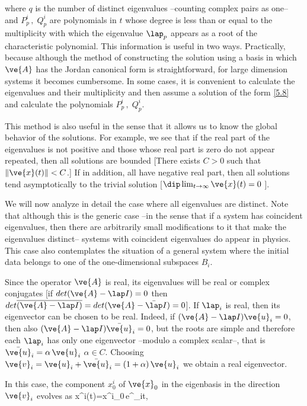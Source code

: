 \noi
where $q$ is the number of distinct eigenvalues --counting complex pairs as one-- and $P^i_p\,,\;Q^i_p$ are polynomials in
$t$ whose degree is less than or equal to the multiplicity with which the
eigenvalue $\lap_p$ appears as a root of the characteristic polynomial. This
information is useful in two ways. Practically, because
although the method of constructing the solution using a basis in
which $\ve{A}$ has the Jordan canonical form is straightforward, for
large dimension systems it becomes cumbersome. In some cases, it is
convenient to calculate the eigenvalues and their multiplicity and then
assume a solution of the form \ref{5.8} and calculate the polynomials 
$P^i_p\,,\;Q^i_p$.

This method is also useful in the sense that it allows us to know the
global behavior of the solutions. For example, we see that if the
real part of the eigenvalues is not positive and those whose real
part is zero do not appear repeated, then all solutions are
bounded [There exists $C>0$ such that $\|\ve{x}(t)\|<C$.] If in addition, all have
negative real part, then all solutions tend
asymptotically to the trivial solution [$\dip\lim_{t\to\infty}
\ve{x}(t) = 0$ ].


We will now analyze in detail the case where all eigenvalues are distinct. Note that although this is the generic case --in the sense that if a system has coincident eigenvalues, then there are arbitrarily small modifications to it that make the eigenvalues distinct-- systems with coincident eigenvalues do appear in physics. This case also contemplates the situation of a general system where the initial data belongs to one of the one-dimensional subspaces $B_i$.

Since the operator $\ve{A}$ is real, its eigenvalues will be real or complex conjugates [if $det(\ve{A}-\lap I)=0$ then $det\overline{(\ve{A}-\lap I)}=det(\ve{A}-\bar{\lap} I)=0$]. If $\lap_i$ is real, then its eigenvector can be chosen to be real. 
Indeed, if $(\ve{A}-\lap I)\ve{u}_i=0$, then also 
$(\ve{A}-\lap I)\bar{\ve{u}}_i=0$, 
but the roots are simple and therefore each $\lap_i$ has only one eigenvector --modulo a complex scalar--, that is 
$\bar{\ve{u}}_i=\alpha\,\ve{u}_i$ $\alpha\in C$. 
Choosing 
$\ve{v}_i=\ve{u}_i+\bar{\ve{u}}_i=(1+\alpha)\,\ve{u}_i$ we obtain a real eigenvector.

In this case, the component $x^i_0$ of $\ve{x}_0$ in the eigenbasis in the direction $\ve{v}_i$ evolves as
\beq
x^i(t)=x^i_0\,e^{\lap_it},
\eeq

